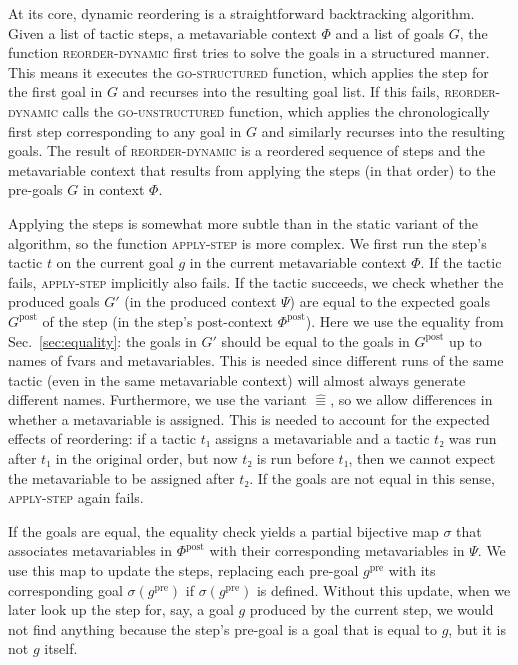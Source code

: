 \documentclass[sigplan,screen]{acmart}
\newcommand{\pre}{\mathrm{pre}}
\newcommand{\post}{\mathrm{post}}
\newcommand{\aeq}{\mathrel{\hat{≡}}}
\begin{document}
At its core, dynamic reordering is a straightforward backtracking algorithm.
Given a list of tactic steps, a metavariable context $Φ$ and a list of goals $G$, the function \textsc{reorder-dynamic} first tries to solve the goals in a structured manner.
This means it executes the \textsc{go-structured} function, which applies the step for the first goal in $G$ and recurses into the resulting goal list.
If this fails, \textsc{reorder-dynamic} calls the \textsc{go-unstructured} function, which applies the chronologically first step corresponding to any goal in $G$ and similarly recurses into the resulting goals.
The result of \textsc{reorder-dynamic} is a reordered sequence of steps and the metavariable context that results from applying the steps (in that order) to the pre-goals $G$ in context $Φ$.

Applying the steps is somewhat more subtle than in the static variant of the algorithm, so the function \textsc{apply-step} is more complex.
We first run the step's tactic $t$ on the current goal $g$ in the current metavariable context $Φ$.
If the tactic fails, \textsc{apply-step} implicitly also fails.
If the tactic succeeds, we check whether the produced goals $G'$ (in the produced context $Ψ$) are equal to the expected goals $G^{\post}$ of the step (in the step's post-context $Φ^{\post}$).
Here we use the equality from Sec.~\ref{sec:equality}: the goals in $G'$ should be equal to the goals in $G^{\post}$ up to names of fvars and metavariables.
This is needed since different runs of the same tactic (even in the same metavariable context) will almost always generate different names.
Furthermore, we use the variant $\aeq$, so we allow differences in whether a metavariable is assigned.
This is needed to account for the expected effects of reordering: if a tactic $t₁$ assigns a metavariable and a tactic $t₂$ was run after $t₁$ in the original order, but now $t₂$ is run before $t₁$, then we cannot expect the metavariable to be assigned after $t₂$.
If the goals are not equal in this sense, \textsc{apply-step} again fails.

If the goals are equal, the equality check yields a partial bijective map $σ$ that associates metavariables in $Φ^{\post}$ with their corresponding metavariables in $Ψ$.
We use this map to update the steps, replacing each pre-goal $g^{\pre}$ with its corresponding goal $σ(g^{\pre})$ if $σ(g^{\pre})$ is defined.
Without this update, when we later look up the step for, say, a goal $g$ produced by the current step, we would not find anything because the step's pre-goal is a goal that is equal to $g$, but it is not $g$ itself.
\end{document}
